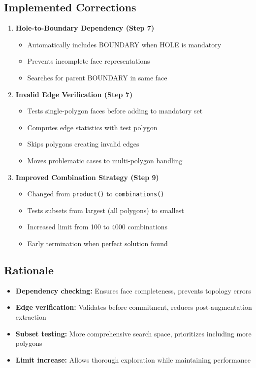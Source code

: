 \documentclass[11pt]{article}
\begin{document}
\subsection{Implemented Corrections}
\begin{enumerate}
    \item \textbf{Hole-to-Boundary Dependency (Step 7)}
    \begin{itemize}
        \item Automatically includes BOUNDARY when HOLE is mandatory
        \item Prevents incomplete face representations
        \item Searches for parent BOUNDARY in same face
    \end{itemize}
    
    \item \textbf{Invalid Edge Verification (Step 7)}
    \begin{itemize}
        \item Tests single-polygon faces before adding to mandatory set
        \item Computes edge statistics with test polygon
        \item Skips polygons creating invalid edges
        \item Moves problematic cases to multi-polygon handling
    \end{itemize}
    
    \item \textbf{Improved Combination Strategy (Step 9)}
    \begin{itemize}
        \item Changed from \texttt{product()} to \texttt{combinations()}
        \item Tests subsets from largest (all polygons) to smallest
        \item Increased limit from 100 to 4000 combinations
        \item Early termination when perfect solution found
    \end{itemize}
\end{enumerate}

\subsection{Rationale}
\begin{itemize}
    \item \textbf{Dependency checking:} Ensures face completeness, prevents topology errors
    \item \textbf{Edge verification:} Validates before commitment, reduces post-augmentation extraction
    \item \textbf{Subset testing:} More comprehensive search space, prioritizes including more polygons
    \item \textbf{Limit increase:} Allows thorough exploration while maintaining performance
\end{itemize}
\end{document}
